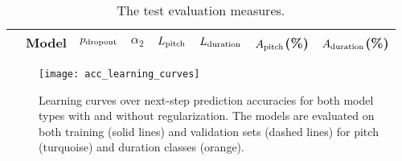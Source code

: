 \begin{table*}
    \centering
    \caption{
        The test evaluation measures.
    }
    \label{tab:test_eval}
    \begin{tabular}{
            l@{}
            S[table-format = 1.0]
            S[table-format = 0.2]
            S[table-format = 1.0]
            S[table-format = 1.3]
            S[table-format = 1.3]
            S[table-format = 2.2]
            S[table-format = 2.2]
        }
        \toprule
        & {Model} 
        & {$p_{\text{dropout}}$}
        & {$\alpha_2$}
        & {$L_{\text{pitch}}$}
        & {$L_{\text{duration}}$}
        & {$A_{\text{pitch}}$(\%)}
        & {$A_{\text{duration}}$(\%)} \\
        \midrule
        
        \bottomrule
    \end{tabular}
\end{table*}

\begin{figure*}
    \centering
    \texttt{[image: acc\_learning\_curves]}
    \caption{Learning curves over next-step prediction accuracies for both model types with and without regularization. The models are evaluated on both training (solid lines) and validation sets (dashed lines) for pitch (turquoise) and duration classes (orange).}
    \label{fig:learning_curves}
\end{figure*}


